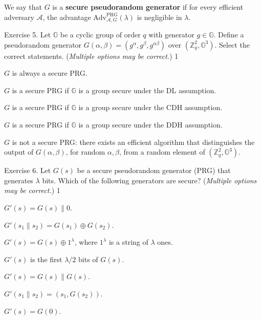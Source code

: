 \documentclass[../../book.tex]{subfiles}
\begin{document}
\begin{definition}
    We say that $G$ is a \textbf{secure pseudorandom generator} if for every efficient 
    adversary $\mathcal{A}$, the advantage $\text{Adv}^{\text{PRG}}_{\mathcal{A},G}(\lambda)$ is 
    negligible in $\lambda$.
\end{definition}

\begin{xexercise}
    {Exercise 5.}
    {Let $\mathbb{G}$ be a cyclic group of order $q$ with generator $g \in \mathbb{G}$. Define a pseudorandom generator $G(\alpha,\beta) = (g^{\alpha},g^{\beta},g^{\alpha\beta})$ over $(\mathbb{Z}_q^2,\mathbb{G}^3)$. Select the correct statements. (\textit{Multiple options may be correct.})}
    {1}
    {
        \item $G$ is always a secure PRG.
        \item $G$ is a secure PRG if $\mathbb{G}$ is a group secure under the DL assumption.
        \item $G$ is a secure PRG if $\mathbb{G}$ is a group secure under the CDH assumption.
        \item $G$ is a secure PRG if $\mathbb{G}$ is a group secure under the DDH assumption.
        \item $G$ is not a secure PRG: there exists an efficient algorithm that distinguishes the output of $G(\alpha,\beta)$, for random $\alpha,\beta$, from a random element of $(\mathbb{Z}_q^2,\mathbb{G}^3)$.
    }
\end{xexercise}

\begin{xexercise}
    {Exercise 6.}
    {Let $G(s)$ be a secure pseudorandom generator (PRG) that generates $\lambda$ bits. Which of the following generators are secure? (\textit{Multiple options may be correct.})}
    {1}
    {
        \item $G'(s) = G(s) \parallel 0$.
        \item $G'(s_1 \parallel s_2) = G(s_1) \oplus G(s_2)$.
        \item $G'(s) = G(s) \oplus 1^{\lambda}$, where $1^{\lambda}$ is a string of $\lambda$ ones.
        \item $G'(s)$ is the first $\lambda/2$ bits of $G(s)$.
        \item $G'(s) = G(s) \parallel G(s)$.
        \item $G'(s_1 \parallel s_2) = (s_1, G(s_2))$.
        \item $G'(s) = G(0)$.
    }
\end{xexercise}
\end{document}
